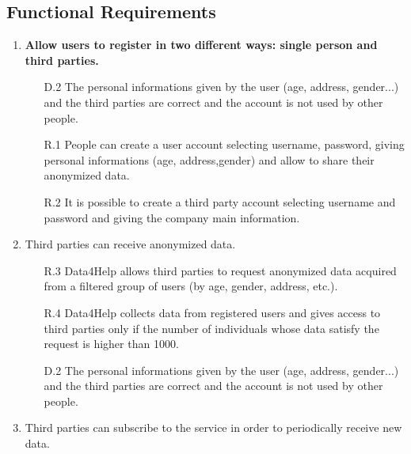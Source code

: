 \documentclass[a4paper]{article}
\begin{document}
    
    \subsection{Functional Requirements}
    
    \begin{enumerate}[label*=\bf{G.\arabic*}]
        
        
        \item \textbf{Allow users to register in two different ways: single person and third parties.}
        
        \begin{enumerate}
            \item [D.2] The personal informations given by the user (age, address, gender...) and the third parties are correct and the account is not used by other people. 
            \item [R.1] People can create a user account selecting username, password, giving personal informations (age, address,gender) and allow to share their anonymized data.
            \item [R.2] It is possible to create a third party account selecting username and password and giving the company main information.
        \end{enumerate}
        
        \item Third parties can receive anonymized data.
                
            \begin{enumerate}
                \item [R.3] Data4Help allows third parties to request anonymized data acquired from a filtered group of users (by age, gender, address, etc.).
                \item [R.4] Data4Help collects data from registered users and gives access to third parties only if the number of individuals whose data satisfy the request is higher than 1000.
                \item [D.2] The personal informations given by the user (age, address, gender...) and the third parties are correct and the account is not used by other people.
            \end{enumerate}
            
            
        \item Third parties can subscribe to the service in order to periodically receive new data.
        

\end{enumerate}
\end{document}
